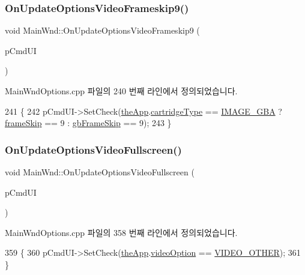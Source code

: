 \subsubsection{\texorpdfstring{On\+Update\+Options\+Video\+Frameskip9()}{OnUpdateOptionsVideoFrameskip9()}}
{\footnotesize\ttfamily void Main\+Wnd\+::\+On\+Update\+Options\+Video\+Frameskip9 (\begin{DoxyParamCaption}\item[{C\+Cmd\+UI $\ast$}]{p\+Cmd\+UI }\end{DoxyParamCaption})\hspace{0.3cm}{\ttfamily [protected]}}



Main\+Wnd\+Options.\+cpp 파일의 240 번째 라인에서 정의되었습니다.


\begin{DoxyCode}
241 \{
242   pCmdUI->SetCheck(\mbox{\hyperlink{_v_b_a_8cpp_a8095a9d06b37a7efe3723f3218ad8fb3}{theApp}}.\mbox{\hyperlink{class_v_b_a_af300759fcbc7eeb00ce73f956fc5ddb7}{cartridgeType}} == \mbox{\hyperlink{_util_8h_aef8b88d56fdf9a25f990a68d80c014d8a25f0ac1f3a37d568346fedece32e4bfb}{IMAGE\_GBA}} ? 
      \mbox{\hyperlink{_globals_8cpp_a668e22999d7fcea3ed14130fd680b795}{frameSkip}} == 9 : \mbox{\hyperlink{_g_b_8cpp_a2139360d32d74969f470ef05414ecaf8}{gbFrameSkip}} == 9);
243 \}
\end{DoxyCode}
\mbox{\label{class_main_wnd_a6d5a346212032eb5299be7575fbafb60}} 
\subsubsection{\texorpdfstring{On\+Update\+Options\+Video\+Fullscreen()}{OnUpdateOptionsVideoFullscreen()}}
{\footnotesize\ttfamily void Main\+Wnd\+::\+On\+Update\+Options\+Video\+Fullscreen (\begin{DoxyParamCaption}\item[{C\+Cmd\+UI $\ast$}]{p\+Cmd\+UI }\end{DoxyParamCaption})\hspace{0.3cm}{\ttfamily [protected]}}



Main\+Wnd\+Options.\+cpp 파일의 358 번째 라인에서 정의되었습니다.


\begin{DoxyCode}
359 \{
360   pCmdUI->SetCheck(\mbox{\hyperlink{_v_b_a_8cpp_a8095a9d06b37a7efe3723f3218ad8fb3}{theApp}}.\mbox{\hyperlink{class_v_b_a_a17dac073149c897f770c00ed7098ad32}{videoOption}} == \mbox{\hyperlink{_v_b_a_8h_a531c35e38ede3ea4e5ba5afb24b29493acab4f90135b50a88563541e679dd6cee}{VIDEO\_OTHER}});
361 \}
\end{DoxyCode}
\mbox{\label{class_main_wnd_afa6d29afbce490545bac5c87e99d18e6}} 
